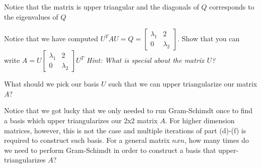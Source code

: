 \begin{enumerate}
{        Notice that the matrix is upper triangular and the diagonals of $Q$ corresponds to the eigenvalues of $Q$
    }


    \qitem Notice that we have computed $U^TAU = Q = \begin{bmatrix}
        \lambda_1 &  2\\
        0 &  \lambda_2
    \end{bmatrix}$. Show that you can write $A = U \begin{bmatrix}
        \lambda_1 &  2\\
        0 &  \lambda_2
    \end{bmatrix} U^T$
    \textit{Hint: What is special about the matrix $U$?}

    \ws{
    \vspace{150px}
    }



    \qitem What should we pick our basis $U$ such that we can upper triangularize our matrix $A$?

    \ws{
    \vspace{150px}
    }


    \qitem Notice that we got lucky that we only needed to run Gram-Schimdt once to find a basis which 
    upper triangularizes our 2x2 matrix $A$. For higher dimension matrices, however, this is not the case 
    and multiple iterations of part (d)-(f) is required to construct such basis. For a general matrix $nxn$, 
    how many times do we need to perform Gram-Schimdt in order to construct a basis that upper-triangularizes $A$? 


\end{enumerate}
